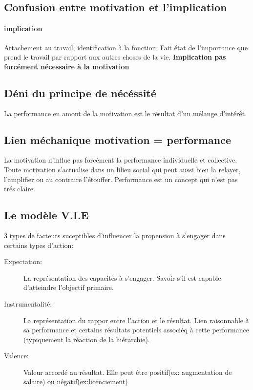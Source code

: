 \documentclass[11pt]{article} %
\begin{document}
	\subsection{Confusion entre motivation et l'implication}
		\paragraph{implication} Attachement au travail, identification à la fonction. Fait état de l'importance
		que prend le travail par rapport aux autres choses de la vie. \textbf{Implication pas forcément nécessaire à la motivation}
	\subsection{Déni du principe de nécéssité}
		La performance en amont de la motivation est le résultat d'un mélange d'intérêt.
	\subsection{Lien méchanique motivation = performance}
		La motivation n'influe pas forcément la performance individuelle et collective. Toute motivation 
		s'actualise dans un lilieu social qui peut aussi bien la relayer, l'amplifier ou au contraire l'étouffer. 
		Performance est un concept qui n'est pas trés claire.
	\subsection{Le modèle V.I.E}
		3 types de facteurs suceptibles d'influencer la propension à s'engager dans certains types d'action:
		\begin{description}
			\item[Expectation: ] La représentation des capacités à s'engager. Savoir s'il est capable d'atteindre 
			l'objectif primaire. 
			\item[Instrumentalité: ] La représentation du rappor entre l'action et le résultat. Lien raisonnable 
			à sa performance et certains résultats potentiels associéq à cette performance (typiquement la 
			réaction de la hiérarchie).
			\item[Valence: ] Valeur accordé au résultat. Elle peut être positif(ex: augmentation de salaire) ou
			négatif(ex:licenciement)
		\end{description}
\end{document}
